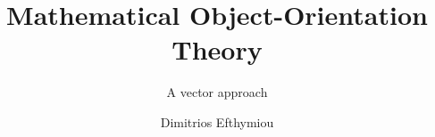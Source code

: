 \documentclass[graybox,envcountchap,sectrefs]{svmono}
\begin{document}
\author{Dimitrios Efthymiou}
\title{Mathematical Object-Orientation Theory}
\subtitle{A vector approach}
\maketitle

\frontmatter

%
%
%
%

\tableofcontents

%


\mainmatter
%

%

\backmatter
%
%
\printindex
\end{document}

